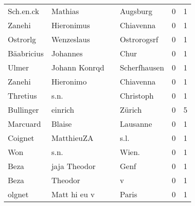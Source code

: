 \begin{center}
\begin{tiny}
\begin{longtabu}{llllrr}
                Sch.en.ck &                            Mathias &             &                                    Augsburg &          0 &         1 \\
                   Zanehi &                         Hieronimus &             &                                   Chiavenna &          0 &         1 \\
                 Ostrorlg &                         Wenzeslaus &             &                                 Ostrorogsrf &          0 &         1 \\
               Bäabricius &                           Johannes &             &                                        Chur &          0 &         1 \\
                    Ulmer &                      Johann Konrqd &             &                                Scherfhausen &          0 &         1 \\
                   Zanehi &                          Hieronimo &             &                                   Chiavenna &          0 &         1 \\
                 Thretius &                               s.n. &             &                                   Christoph &          0 &         1 \\
                Bullinger &                            einrich &             &                                      Zürich &          0 &         5 \\
                 Marcuard &                             Blaise &             &                                    Lausanne &          0 &         1 \\
                  Coignet &                         MatthieuZA &             &                                        s.l. &          0 &         1 \\
                      Won &                               s.n. &             &                                      Wien.  &          0 &         1 \\
                     Beza &                       jaja Theodor &             &                                        Genf &          0 &         1 \\
                     Beza &                            Theodor &             &                                           v &          0 &         1 \\
                   olgnet &                       Matt hi eu v &             &                                       Paris &          0 &         1 \\

\end{longtabu}
\end{tiny}
\end{center}
